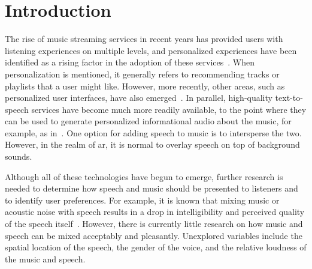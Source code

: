 \documentclass[a4paper,10pt]{edpsci} %
\begin{document}



\date{Received XX January 2026, Accepted XX}

\maketitle

\section{Introduction}

The rise of music streaming services in recent years has provided users with listening experiences on multiple levels, and personalized experiences have been identified as a rising factor in the adoption of these services~\cite{barata_music_2021}. When personalization is mentioned, it generally refers to recommending tracks or playlists that a user might like. However, more recently, other areas, such as personalized user interfaces, have also emerged~\cite{noauthor_ai_2024}. In parallel, high-quality text-to-speech services have become much more readily available, to the point where they can be used to generate personalized informational audio about the music, for example, as in~\cite{noauthor_spotify_2023}. One option for adding speech to music is to intersperse the two. However, in the realm of \gls{ar}, it is normal to overlay speech on top of background sounds. 

Although all of these technologies have begun to emerge, further research is needed to determine how speech and music should be presented to listeners and to identify user preferences. For example, it is known that mixing music or acoustic noise with speech results in a drop in intelligibility and perceived quality of the speech itself~\cite{fichna2022}. However, there is currently little research on how music and speech can be mixed acceptably and pleasantly. Unexplored variables include the spatial location of the speech, the gender of the voice, and the relative loudness of the music and speech.
\end{document}
